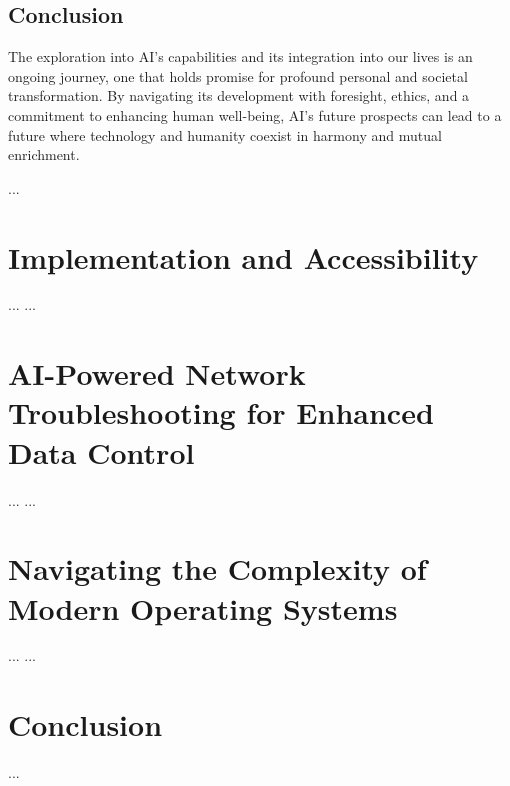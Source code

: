 \documentclass[12pt]{article}
\begin{document}
\subsection*{Conclusion}
The exploration into AI's capabilities and its integration into our lives is an ongoing journey, one that holds promise for profound personal and societal transformation. By navigating its development with foresight, ethics, and a commitment to enhancing human well-being, AI's future prospects can lead to a future where technology and humanity coexist in harmony and mutual enrichment.

...
\section*{Implementation and Accessibility}
...
...

\section{AI-Powered Network Troubleshooting for Enhanced Data Control}
...
...

\section{Navigating the Complexity of Modern Operating Systems}
...
...

\section*{Conclusion}
...


\end{document}
